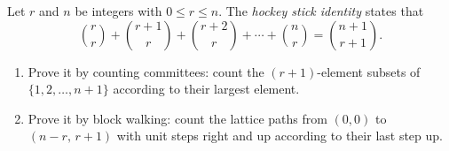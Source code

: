 Let $r$ and $n$ be integers with $0\le r\le n$. The \emph{hockey stick identity} states that
\[\binom rr+\binom{r+1}r+\binom{r+2}r+\cdots+\binom nr=\binom{n+1}{r+1}.\]
\begin{enumerate}
\item[(a)] Prove it by counting committees: count the $(r+1)$-element subsets of $\{1,2,\ldots,n+1\}$ according to their largest element.
\item[(b)] Prove it by block walking: count the lattice paths from $(0,0)$ to $(n-r,\,r+1)$ with unit steps right and up according to their last step up.
\end{enumerate}
